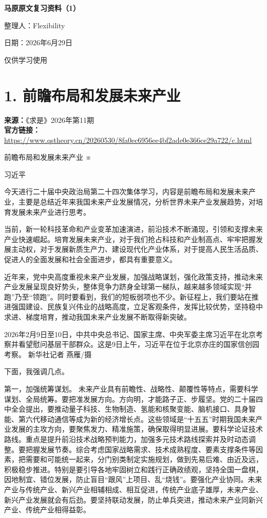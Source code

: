 \documentclass[UTF8,zihao=-4]{ctexart}
\begin{document}
\begin{titlepage}
\thispagestyle{empty}
\centering
\vspace*{0.22\textheight}
{\bfseries 马原原文复习资料（1）\par}
\vspace{2.5cm}
{整理人：Flexibility\par}
\vspace{0.8cm}
{日期：2026年6月29日\par}
\vfill
{仅供学习使用\par}
\end{titlepage}
\setcounter{page}{1}
\tableofcontents
\clearpage
\section*{1. 前瞻布局和发展未来产业}
\noindent\textbf{来源：}《求是》2026年第11期\\
\noindent\textbf{官方链接：}
\noindent\url{https://www.qstheory.cn/20260530/8fa0ec6956ee4bf2ade0e366ce29a722/c.html}

前瞻布局和发展未来产业 ※

习近平

今天进行二十届中央政治局第二十四次集体学习，内容是前瞻布局和发展未来产业，主要是总结近年来我国未来产业发展情况，分析世界未来产业发展趋势，对培育发展未来产业进行思考。

当前，新一轮科技革命和产业变革加速演进，前沿技术不断涌现，引领和支撑未来产业快速崛起。培育发展未来产业，对于我们抢占科技和产业制高点、牢牢把握发展主动权，对于发展新质生产力、建设现代化产业体系，对于提高人民生活品质、促进人的全面发展和社会全面进步，都具有重要意义。

近年来，党中央高度重视未来产业发展，加强战略谋划，强化政策支持，推动未来产业发展呈现良好势头，整体竞争力跻身全球第一梯队，越来越多领域实现“并跑”乃至“领跑”。同时要看到，我们的短板弱项也不少。新征程上，我们要站在推进强国建设、民族复兴伟业的战略高度，立足客观条件，发挥比较优势，坚持稳中求进、梯度培育，推动我国未来产业发展不断取得新突破。

2026年2月9日至10日，中共中央总书记、国家主席、中央军委主席习近平在北京考察并看望慰问基层干部群众。这是9日上午，习近平在位于北京亦庄的国家信创园考察。 新华社记者 燕雁/摄

下面，我强调几点。

第一，加强统筹谋划。 未来产业具有前瞻性、战略性、颠覆性等特点，需要科学谋划、全局统筹。要把准发展方向。方向明，才能路子正、步履坚。党的二十届四中全会提出，要推动量子科技、生物制造、氢能和核聚变能、脑机接口、具身智能、第六代移动通信等成为新的经济增长点。这些领域是“十五五”时期我国未来产业发展的主攻方向，要聚焦发力、精准施策，确保取得明显进展。要科学论证技术路线。重点是提升前沿技术战略预判能力，加强多元技术路线探索并及时动态调整。要把握发展节奏。综合考虑国家战略需求、技术成熟程度、要素支撑条件等因素，把需要和可能统一起来，分门别类制定实施规划，做到先易后难、由近及远，积极稳步推进。特别是要引导各地牢固树立和践行正确政绩观，坚持全国一盘棋，因地制宜、错位发展，防止盲目“跟风”上项目、乱“烧钱”。要强化产业协同。未来产业与传统产业、新兴产业相辅相成、相互促进，传统产业底子雄厚，未来产业、新兴产业发展就会有后劲。要坚持联动发展，防止单兵突进，推动未来产业同新兴产业、传统产业相得益彰。
\end{document}
